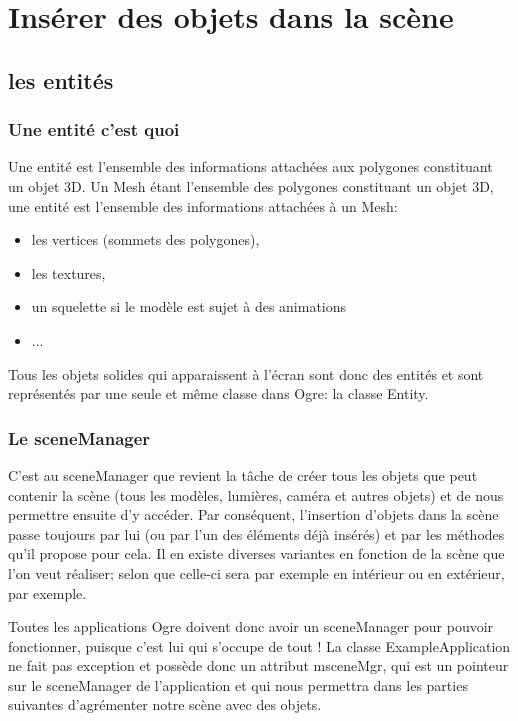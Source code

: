 

\chapter{Insérer des objets dans la scène }

\section{les entités}

\subsection{Une entité c'est quoi}
Une entité est l'ensemble des informations attachées aux polygones constituant un objet 3D.\newline
Un Mesh étant l'ensemble des polygones constituant un objet 3D, une entité est l'ensemble des informations attachées à un Mesh:

\begin{itemize}
\item les vertices (sommets des polygones),
\item les textures,
\item un squelette si le modèle est sujet à des animations
\item...\newline
\end{itemize}


Tous les objets solides qui apparaissent à l'écran sont donc des entités et sont représentés par une seule et même classe dans Ogre: la classe Entity.

\subsection{Le sceneManager}
C'est au sceneManager que revient la tâche de créer tous les objets que peut contenir la scène (tous les modèles, lumières, caméra et autres objets) et de nous permettre ensuite d'y accéder.\newline
Par conséquent, l'insertion d'objets dans la scène passe toujours par lui (ou par l'un des éléments déjà insérés) et par les méthodes qu'il propose pour cela.
Il en existe diverses variantes en fonction de la scène que l'on veut réaliser; selon que celle-ci sera par exemple en intérieur ou en extérieur, par exemple.

Toutes les applications Ogre doivent donc avoir un sceneManager pour pouvoir fonctionner, puisque c'est lui qui s'occupe de tout ! La classe ExampleApplication ne fait pas exception et possède donc un attribut msceneMgr, qui est un pointeur sur le sceneManager de l'application et qui nous permettra dans les parties suivantes d'agrémenter notre scène avec des objets.


